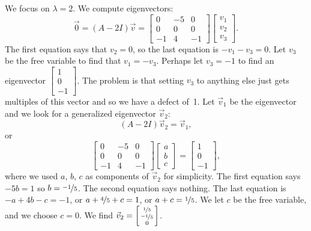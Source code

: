 \begin{example}
We focus on $\lambda = 2$.  We compute eigenvectors:
\begin{equation*}
\vec{0} =
(A - 2 I) \vec{v}
=
\begin{bmatrix}
0 & -5 & 0 \\
0 & 0 & 0 \\
-1 & 4 & -1
\end{bmatrix}
\begin{bmatrix}
v_1 \\ v_2 \\ v_3
\end{bmatrix}
.
\end{equation*}
The first equation says that $v_2 = 0$, so the last equation
is $-v_1 -v_3 = 0$.  Let $v_3$ be the free variable to find
that $v_1 = -v_3$.  Perhaps let $v_3 = -1$ to find an eigenvector
$\left[ \begin{smallmatrix} 1 \\ 0 \\ -1 \end{smallmatrix} \right]$.
The problem is that setting $v_3$ to anything else just gets multiples
of this vector and so we have a defect of~1.
Let $\vec{v}_1$ be the eigenvector and we look for
a generalized eigenvector $\vec{v}_2$:
\begin{equation*}
(A - 2 I) \vec{v}_2 = \vec{v}_1 , 
\end{equation*}
or
\begin{equation*}
\begin{bmatrix}
0 & -5 & 0 \\
0 & 0 & 0 \\
-1 & 4 & -1
\end{bmatrix}
\begin{bmatrix}
a \\ b \\ c
\end{bmatrix}
=
\begin{bmatrix}
1 \\ 0 \\ -1
\end{bmatrix} ,
\end{equation*}
where we used $a$, $b$, $c$ as components of $\vec{v}_2$ for simplicity.
The first equation says $-5b = 1$ so $b = \nicefrac{-1}{5}$.  The
second equation says nothing.
The last equation is $-a + 4b - c = -1$, or
$a + \nicefrac{4}{5} + c = 1$, or
$a + c = \nicefrac{1}{5}$.  We let $c$ be the free variable, and we
choose $c=0$.  We find
$\vec{v}_2 = \left[ \begin{smallmatrix} \nicefrac{1}{5} \\ \nicefrac{-1}{5}
\\ 0 \end{smallmatrix} \right]$.


\end{example}
